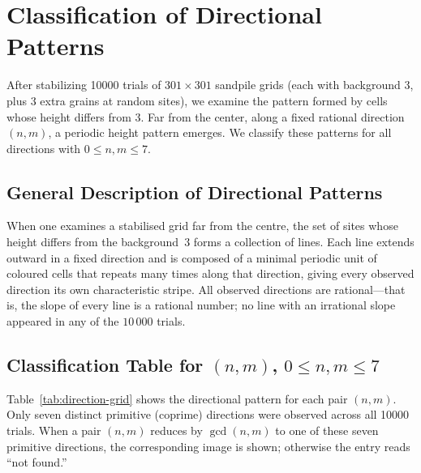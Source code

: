 \documentclass[main.tex]{subfiles}
\begin{document}
\pagestyle{plain}
\setcounter{chapter}{1}

\chapter{Classification of Directional Patterns}
\label{chap:classification}

After stabilizing 10000 trials of $301\times 301$ sandpile grids (each with background 3, plus 3 extra grains at random sites), we examine the pattern formed by cells whose height differs from 3. Far from the center, along a fixed rational direction $(n,m)$, a periodic height pattern emerges. We classify these patterns for all directions with $0 \le n,m \le 7$.

\section{General Description of Directional Patterns}

When one examines a stabilised grid far from the centre, the set of sites whose height differs from the background~$3$ forms a collection of lines. Each line extends outward in a fixed direction and is composed of a minimal periodic unit of coloured cells that repeats many times along that direction, giving every observed direction its own characteristic stripe. All observed directions are rational---that is, the slope of every line is a rational number; no line with an irrational slope appeared in any of the $10\,000$ trials.

\section{Classification Table for $(n,m)$, $0 \le n,m \le 7$}

Table~\ref{tab:direction-grid} shows the directional pattern for each pair $(n,m)$. Only seven distinct primitive (coprime) directions were observed across all 10000 trials. When a pair $(n,m)$ reduces by $\gcd(n,m)$ to one of these seven primitive directions, the corresponding image is shown; otherwise the entry reads ``not found.''
\end{document}
